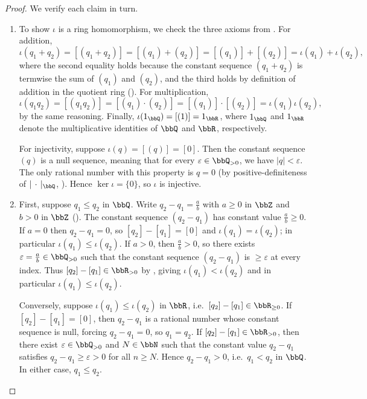 \begin{proof}
    We verify each claim in turn.

    \begin{enumerate}
        \item To show $\iota$ is a ring homomorphism, we check the three axioms from . For addition,
        $$\iota(q_1 + q_2) = [(q_1 + q_2)] = [(q_1) + (q_2)] = [(q_1)] + [(q_2)] = \iota(q_1) + \iota(q_2),$$
        where the second equality holds because the constant sequence $(q_1 + q_2)$ is termwise the sum of $(q_1)$ and $(q_2)$, and the third holds by definition of addition in the quotient ring (). For multiplication,
        $$\iota(q_1 q_2) = [(q_1 q_2)] = [(q_1) \cdot (q_2)] = [(q_1)] \cdot [(q_2)] = \iota(q_1) \iota(q_2),$$
        by the same reasoning. Finally, $\iota(1_\bbQ) = [(1)] = 1_{\bbR}$, where $1_\bbQ$ and $1_{\bbR}$ denote the multiplicative identities of $\bbQ$ and $\bbR$, respectively.

        For injectivity, suppose $\iota(q) = [(q)] = [0]$. Then the constant sequence $(q)$ is a null sequence, meaning that for every $\varepsilon \in \bbQ_{>0}$, we have $|q| < \varepsilon$. The only rational number with this property is $q = 0$ (by positive-definiteness of $|\,\cdot\,|_\bbQ$, ). Hence $\ker \iota = \{0\}$, so $\iota$ is injective.

        \item First, suppose $q_1 \le q_2$ in $\bbQ$. Write $q_2 - q_1 = \frac{a}{b}$ with $a \ge 0$ in $\bbZ$ and $b > 0$ in $\bbZ$ (). The constant sequence $(q_2 - q_1)$ has constant value $\frac{a}{b} \ge 0$. If $a = 0$ then $q_2 - q_1 = 0$, so $[q_2] - [q_1] = [0]$ and $\iota(q_1) = \iota(q_2)$; in particular $\iota(q_1) \le \iota(q_2)$. If $a > 0$, then $\frac{a}{b} > 0$, so there exists $\varepsilon = \frac{a}{b} \in \bbQ_{>0}$ such that the constant sequence $(q_2 - q_1)$ is $\ge \varepsilon$ at every index. Thus $[q_2] - [q_1] \in \bbR_{>0}$ by , giving $\iota(q_1) < \iota(q_2)$ and in particular $\iota(q_1) \le \iota(q_2)$.

        Conversely, suppose $\iota(q_1) \le \iota(q_2)$ in $\bbR$, i.e.\ $[q_2] - [q_1] \in \bbR_{\ge 0}$. If $[q_2] - [q_1] = [0]$, then $q_2 - q_1$ is a rational number whose constant sequence is null, forcing $q_2 - q_1 = 0$, so $q_1 = q_2$. If $[q_2] - [q_1] \in \bbR_{>0}$, then there exist $\varepsilon \in \bbQ_{>0}$ and $N \in \bbN$ such that the constant value $q_2 - q_1$ satisfies $q_2 - q_1 \ge \varepsilon > 0$ for all $n \ge N$. Hence $q_2 - q_1 > 0$, i.e.\ $q_1 < q_2$ in $\bbQ$. In either case, $q_1 \le q_2$.


\end{enumerate}
\end{proof}
